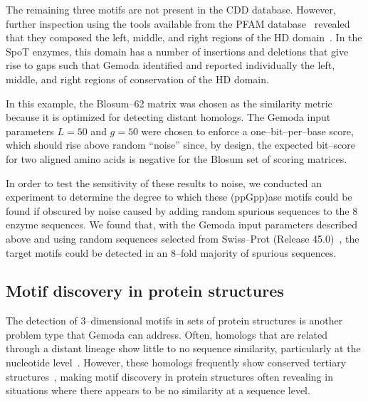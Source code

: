     The remaining three motifs are not present in
    the CDD database.  However, further inspection
    using the tools available from the PFAM
    database~\citep{bateman2004pfam} revealed that
    they composed the left, middle, and right regions
    of the HD domain~\citep{aravind1998hd}.
    In the SpoT enzymes, this domain has a number
    of insertions and deletions that give rise to
    gaps such that Gemoda identified and reported
    individually the left, middle, and right regions
    of conservation of the HD domain.

    In this example, the Blosum--62 matrix was chosen
    as the similarity metric because it is optimized
    for detecting distant homologs.  The Gemoda
    input parameters $L=50$ and $g=50$ were
    chosen to enforce a one--bit--per--base score,
    which should rise above random ``noise'' since,
    by design, the expected bit--score for two aligned
    amino acids is negative for the Blosum set
    of scoring matrices.

    In order to test the sensitivity of these results
    to noise, we conducted an experiment to determine
    the degree to which these (ppGpp)ase motifs
    could be found if obscured by noise caused by
    adding random spurious sequences to the 8 enzyme
    sequences.  We found that, with the Gemoda input
    parameters described above and using random
    sequences selected from Swiss--Prot (Release
    45.0)~\citep{bairoch2000swiss-prot}, the target
    motifs could be detected in an 8--fold majority
    of spurious sequences.





    \subsection{Motif discovery in protein structures}

    The detection of 3--dimensional motifs in sets
    of protein structures is another
    problem type that Gemoda can address.
    Often, homologs that are related through a
    distant lineage show little to no
    sequence similarity, particularly at the nucleotide
    level~\citep{eidhammer2000structure}.  However,
    these homologs frequently show conserved tertiary
    structures~\citep{dietmass2001indentification},
    making motif discovery in protein structures often
    revealing in situations where there appears to
    be no similarity at a sequence level.

